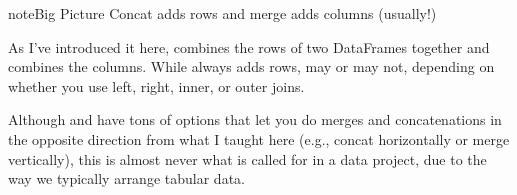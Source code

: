 \documentclass[letterpaper,10pt,english]{jupyterBook}
\begin{document}
\begin{sphinxadmonition}{note}{Big Picture \sphinxhyphen{} Concat adds rows and merge adds columns (usually!)}

\sphinxAtStartPar
As I’ve introduced it here,  combines the rows of two DataFrames together and  combines the columns.  While  always adds rows,  may or may not, depending on whether you use left, right, inner, or outer joins.

\sphinxAtStartPar
Although  and  have tons of options that let you do merges and concatenations in the opposite direction from what I taught here (e.g., concat horizontally or merge vertically), this is almost never what is called for in a data project, due to the way we typically arrange tabular data.
\end{sphinxadmonition}
\end{document}

